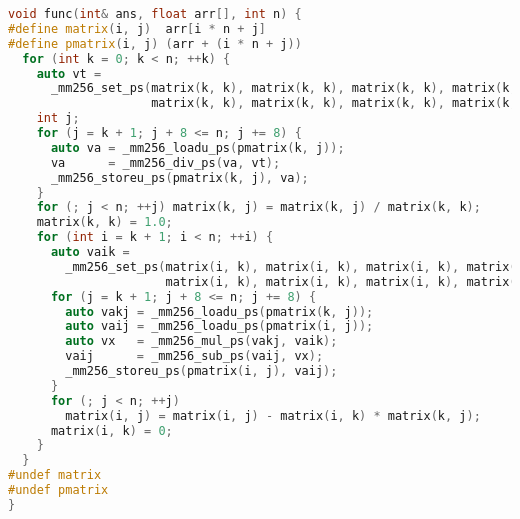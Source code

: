 \documentclass[a4paper]{article}
\begin{document}
\begin{lstlisting}[title=AVX 内存未对齐算法,frame=trbl,language={C++}]
void func(int& ans, float arr[], int n) {
#define matrix(i, j)  arr[i * n + j]
#define pmatrix(i, j) (arr + (i * n + j))
  for (int k = 0; k < n; ++k) {
    auto vt =
      _mm256_set_ps(matrix(k, k), matrix(k, k), matrix(k, k), matrix(k, k),
                    matrix(k, k), matrix(k, k), matrix(k, k), matrix(k, k));
    int j;
    for (j = k + 1; j + 8 <= n; j += 8) {
      auto va = _mm256_loadu_ps(pmatrix(k, j));
      va      = _mm256_div_ps(va, vt);
      _mm256_storeu_ps(pmatrix(k, j), va);
    }
    for (; j < n; ++j) matrix(k, j) = matrix(k, j) / matrix(k, k);
    matrix(k, k) = 1.0;
    for (int i = k + 1; i < n; ++i) {
      auto vaik =
        _mm256_set_ps(matrix(i, k), matrix(i, k), matrix(i, k), matrix(i, k),
                      matrix(i, k), matrix(i, k), matrix(i, k), matrix(i, k));
      for (j = k + 1; j + 8 <= n; j += 8) {
        auto vakj = _mm256_loadu_ps(pmatrix(k, j));
        auto vaij = _mm256_loadu_ps(pmatrix(i, j));
        auto vx   = _mm256_mul_ps(vakj, vaik);
        vaij      = _mm256_sub_ps(vaij, vx);
        _mm256_storeu_ps(pmatrix(i, j), vaij);
      }
      for (; j < n; ++j)
        matrix(i, j) = matrix(i, j) - matrix(i, k) * matrix(k, j);
      matrix(i, k) = 0;
    }
  }
#undef matrix
#undef pmatrix
}
\end{lstlisting}
\end{document}
